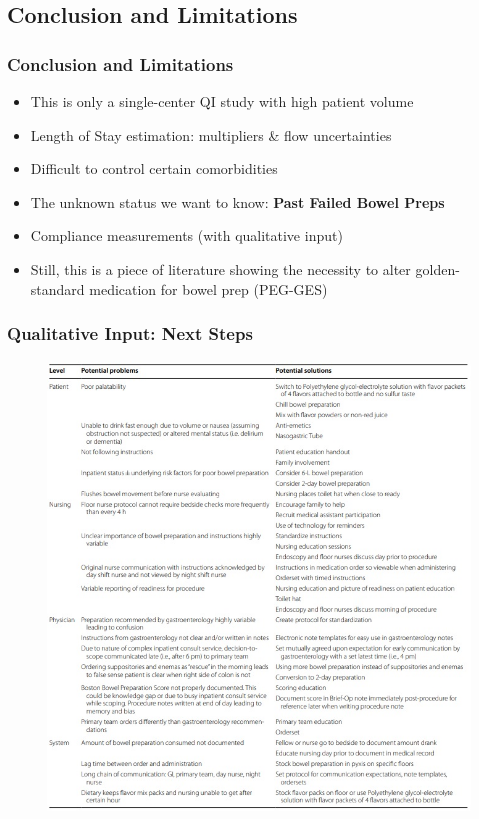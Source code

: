 \documentclass[pdflatex]{beamer}
\begin{document}
\subsection{Conclusion and Limitations}
\begin{frame}
\frametitle{Conclusion and Limitations}
\begin{itemize}
  \item This is only a single-center QI study with high patient volume
  \item Length of Stay estimation: multipliers \& flow uncertainties
\end{itemize}
\medskip
\begin{itemize}
    \item Difficult to control certain comorbidities
    \item The unknown status we want to know: {\bf Past Failed Bowel Preps}
    \item Compliance measurements (with qualitative input)
\end{itemize}
\medskip
\begin{itemize}
  \item Still, this is a piece of literature showing the necessity to alter golden-standard medication for bowel prep (PEG-GES)
\end{itemize}
\end{frame}

\begin{frame}
\frametitle{Qualitative Input: Next Steps}
\begin{figure}
\includegraphics[width=0.5\linewidth]{./Tables/Table_3.jpg}
\end{figure}
\end{frame}
\end{document}
